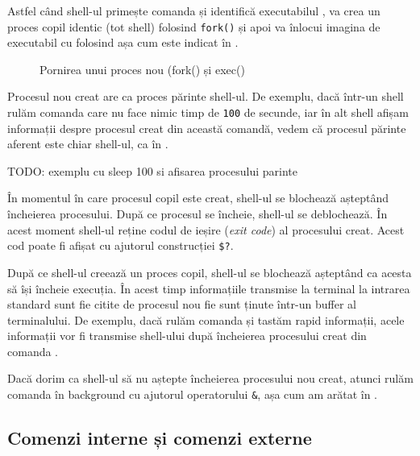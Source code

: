 Astfel când shell-ul primește comanda  și identifică executabilul , va
crea un proces copil identic (tot shell) folosind \texttt{fork()} și apoi va înlocui
imagina de executabil cu  folosind  așa cum este indicat în .

\begin{figure}[htbp]
  \centering
  \def\svgwidth{\columnwidth}
  
  \caption{Pornirea unui proces nou (fork() și exec()}
  \label{fig:cli:fork-exec}
\end{figure}

Procesul nou creat are ca proces părinte shell-ul. De exemplu, dacă într-un
shell rulăm comanda  care nu face nimic timp de \texttt{100} de secunde, iar în
alt shell afișam informații despre procesul creat din această comandă, vedem că
procesul părinte aferent este chiar shell-ul, ca în .

\begin{screen}[caption={Shell-ul ca proces părinte},label={lst:cli:shell-child}]
TODO: exemplu cu sleep 100 si afisarea procesului parinte
\end{screen}

În momentul în care procesul copil este creat, shell-ul se blochează așteptând
încheierea procesului. După ce procesul se încheie, shell-ul se deblochează. În
acest moment shell-ul reține codul de ieșire (\textit{exit code}) al procesului creat.
Acest cod poate fi afișat cu ajutorul construcției \texttt{\$?}.

După ce shell-ul creează un proces copil, shell-ul se blochează așteptând ca
acesta să își încheie execuția. În acest timp informațiile transmise la terminal
la intrarea standard sunt fie citite de procesul nou fie sunt ținute într-un
buffer al terminalului. De exemplu, dacă rulăm comanda  și tastăm rapid
informații, acele informații vor fi transmise shell-ului după încheierea
procesului creat din comanda .

Dacă dorim ca shell-ul să nu aștepte încheierea procesului nou creat, atunci
rulăm comanda în background cu ajutorul operatorului \texttt{\&}, așa cum am arătat în
.

\subsection{Comenzi interne și comenzi externe}
\label{sec:cli-internal-cmds}

